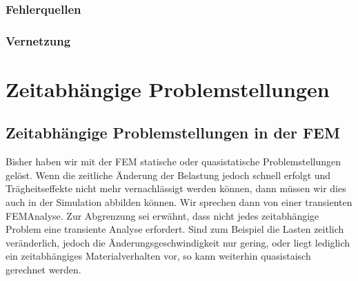 \documentclass[letterpaper,10pt,german]{jupyterBook}
\begin{document}
\section{Fehlerquellen}
\label{\detokenize{chapters/chapter4/Fehlerquellen:fehlerquellen}}\label{\detokenize{chapters/chapter4/Fehlerquellen::doc}}
\sphinxstepscope


\section{Vernetzung}
\label{\detokenize{chapters/chapter4/Vernetzung:vernetzung}}\label{\detokenize{chapters/chapter4/Vernetzung::doc}}
\sphinxstepscope


\part{Zeitabhängige Problemstellungen}

\sphinxstepscope


\chapter{Zeitabhängige Problemstellungen in der FEM}
\label{\detokenize{chapters/chapter6/Overview:zeitabhangige-problemstellungen-in-der-fem}}\label{\detokenize{chapters/chapter6/Overview::doc}}
\sphinxAtStartPar
Bisher haben wir mit der FEM statische oder quasistatische Problemstellungen gelöst. Wenn die zeitliche Änderung der Belastung jedoch schnell erfolgt und Trägheitseffekte nicht mehr vernachlässigt werden können, dann müssen wir dies auch in der Simulation abbilden können. Wir sprechen dann von einer transienten FEM\sphinxhyphen{}Analyse. Zur Abgrenzung sei erwähnt, dass nicht jedes zeitabhängige Problem eine transiente Analyse erfordert. Sind zum Beispiel die Lasten zeitlich veränderlich, jedoch die Änderungsgeschwindigkeit nur gering, oder liegt lediglich ein zeitabhängiges Materialverhalten vor, so kann weiterhin quasistaisch gerechnet werden.
\end{document}
